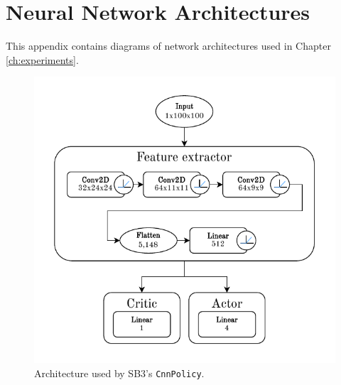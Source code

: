 \documentclass[
  digital,     %
  oneside,     %
  nosansbold,  %
  nocolorbold, %
  lof,         %
  lot,         %
]{fithesis4}
\begin{document}
\printbibliography[heading=bibintoc] %


\appendix %
\chapter{Neural Network Architectures}
This appendix contains diagrams of network architectures used in Chapter \ref{ch:experiments}.

\begin{figure}
    \includegraphics[width=1\linewidth]{diagrams/cnn_arch.pdf}
    \caption{Architecture used by SB3's \texttt{CnnPolicy}.}
    \label{fig:cnn_policy}
\end{figure}
\end{document}
